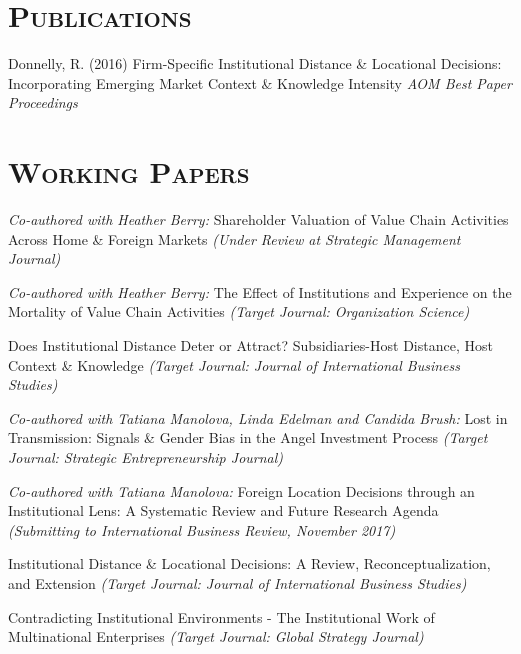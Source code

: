 \documentclass[margin, 12pt]{res}
\begin{document}
\begin{resume}
\section{\normalfont\textsc{Publications}}
Donnelly, R. (2016) Firm-Specific Institutional Distance \& Locational Decisions: Incorporating Emerging Market Context \& Knowledge Intensity  \textit{AOM  Best Paper Proceedings}


\section{\normalfont\textsc{Working Papers}}


\textit{Co-authored with Heather Berry:} Shareholder Valuation of Value Chain Activities Across Home \& Foreign Markets \textit{(Under Review at Strategic Management Journal)}

\textit{Co-authored with Heather Berry:}  The Effect of Institutions and Experience on the Mortality of Value Chain Activities
\textit{(Target Journal: Organization Science)}


Does Institutional Distance Deter or Attract? Subsidiaries-Host Distance, Host Context \& Knowledge	
\textit{(Target Journal: Journal of International Business Studies)}


\textit{Co-authored with Tatiana Manolova, Linda Edelman and Candida Brush:}
Lost in Transmission: Signals \& Gender Bias in the Angel Investment Process 
\textit{(Target Journal: Strategic Entrepreneurship Journal)}

\textit{Co-authored with Tatiana Manolova:} Foreign Location Decisions through an Institutional Lens: A Systematic Review and Future Research Agenda  
\textit{(Submitting to International Business Review, November 2017)} 


Institutional Distance \& Locational Decisions: A Review, Reconceptualization, and Extension 
\textit{(Target Journal: Journal of International Business Studies)}

Contradicting Institutional Environments - The Institutional Work of Multinational Enterprises 
\textit{(Target Journal: Global Strategy Journal)}

\bigskip
\bigskip


\end{resume}
\end{document}
